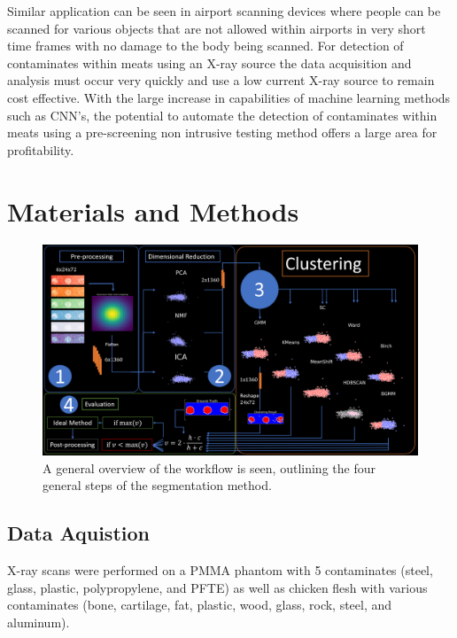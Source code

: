 \documentclass[a4paper,11pt]{article}
\begin{document}
Similar application can be seen in airport scanning devices where people can be scanned for various objects that are not allowed within airports in very short time frames with no damage to the body being scanned. For detection of contaminates within meats using an X-ray source the data acquisition and analysis must occur very quickly and use a low current X-ray source to remain cost effective. With the large increase in capabilities of machine learning methods such as CNN's, the potential to automate the detection of contaminates within meats using a pre-screening non intrusive testing method offers a large area for profitability. 





\section{Materials and Methods}
\label{sec:methods}

\begin{figure}[b!]

\includegraphics[width=\textwidth]{figures/flow_chart.png}

\caption{A general overview of the workflow is seen, outlining the four general steps of the segmentation method.}
\label{overview}
\end{figure}

\subsection{Data Aquistion}
X-ray scans were performed on a PMMA phantom with 5 contaminates (steel, glass, plastic, polypropylene, and PFTE) as well as chicken flesh with various contaminates (bone, cartilage, fat, plastic, wood, glass, rock, steel, and aluminum).
\end{document}
